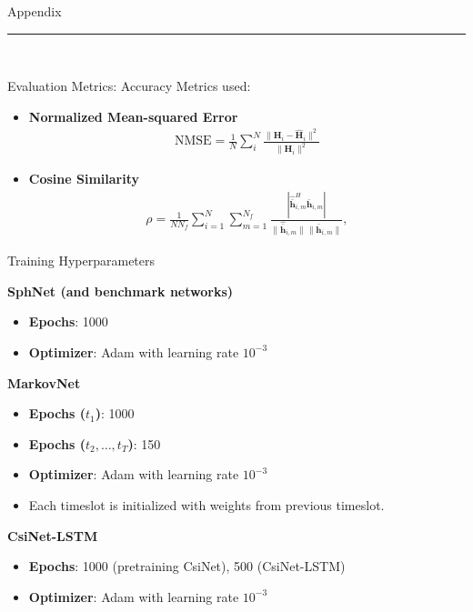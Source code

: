\documentclass{beamer}
\begin{document}
  \begin{frame}[plain]
    \vfill
    \centering
    \begin{beamercolorbox}[sep=8pt,center,shadow=true,rounded=true]{Appendix}
      \insertsectionhead\par%
      \color{davisblue}\noindent\rule{10cm}{1pt} \\
    \end{beamercolorbox}
    \vfill
  \end{frame} 

  \begin{frame}{Evaluation Metrics: Accuracy}
    Metrics used:
    \begin{itemize}
      \item \textbf{Normalized Mean-squared Error}
      \begin{align*}
        \text{NMSE} = \frac 1N \sum_{i}^N \frac{\|\mathbf H_i - \hat{\mathbf H}_i \|^2}{\|\mathbf H_i \|^2}
      \end{align*}
      \item \textbf{Cosine Similarity}
      \begin{align*}
          \rho=\frac{1}{N N_{f}} \sum_{i=1}^{N} \sum_{m=1}^{N_{f}} \frac{|\hat{\bar{\mathbf{h}}}_{i,m}^{H} \bar{\mathbf{h}}_{i,m}|}{\|\hat{\bar{\mathbf{h}}}_{i,m}\|\|\bar{\mathbf{h}}_{i,m}\|},
      \end{align*}
    \end{itemize}
  \end{frame}

  \begin{frame}{Training Hyperparameters}
    \footnotesize{
      \textbf{SphNet (and benchmark networks)}
      \begin{itemize}
        \item \textbf{Epochs}: 1000
        \item \textbf{Optimizer}: Adam with learning rate $10^{-3}$
      \end{itemize}
      \textbf{MarkovNet}
      \begin{itemize}
        \item \textbf{Epochs ($t_1$)}: 1000
        \item \textbf{Epochs ($t_2,\dots,t_T$)}: 150
        \item \textbf{Optimizer}: Adam with learning rate $10^{-3}$
        \item Each timeslot is initialized with weights from previous timeslot.
      \end{itemize}
      \textbf{CsiNet-LSTM}
      \begin{itemize}
        \item \textbf{Epochs}: 1000 (pretraining CsiNet), 500 (CsiNet-LSTM)
        \item \textbf{Optimizer}: Adam with learning rate $10^{-3}$
      \end{itemize}
      }
  \end{frame}
\end{document}
